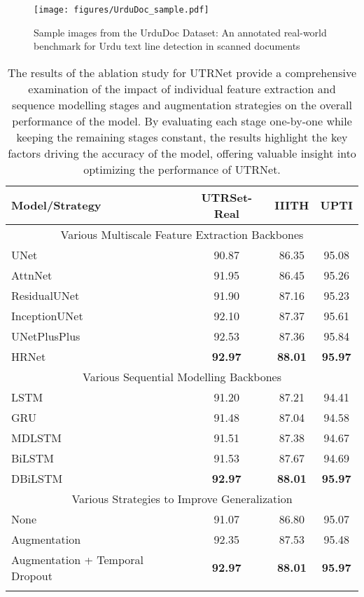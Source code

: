 \documentclass[runningheads]{llncs}
\newcommand{\ModelName}{{UTRNet}\xspace}
\newcommand{\DatasetNameReal}{{UTRSet-Real}\xspace}
\newcommand{\DetectionDataset}{{UrduDoc}\xspace}
\begin{document}
\begin{figure}[t]
	\label{fig:urdudoc_samples}
	\texttt{[image: figures/UrduDoc\_sample.pdf]}
	\caption{Sample images from the {\DetectionDataset} Dataset: An annotated real-world benchmark for Urdu text line detection in scanned documents}
\end{figure} 
\begin{table}[t]
\centering
\setlength{\tabcolsep}{10pt}
\begin{tabular}{lccc}
	\toprule[1.5pt]
	\textbf{Model/Strategy} & \textbf{\DatasetNameReal} & \textbf{IIITH} & \textbf{UPTI} \\ 
	\midrule[1.5pt]
	\multicolumn{4}{c}{Various Multiscale Feature Extraction Backbones} \\
	\midrule[0.5pt]
	UNet \cite{unet_orig_paper} & 90.87 & 86.35 & 95.08 \\
	AttnNet \cite{attn_unet} & 91.95 & 86.45 & 95.26 \\
	ResidualUNet \cite{res_unet} & 91.90 & 87.16 & 95.23 \\
	InceptionUNet \cite{inception_unet} & 92.10 & 87.37 & 95.61 \\
	UNetPlusPlus \cite{unet_plus_plus} & 92.53 & 87.36 & 95.84 \\
	HRNet \cite{hrnet_orig} & \textbf{92.97} & \textbf{88.01} & \textbf{95.97} \\ 
\midrule[0.5pt]
	\multicolumn{4}{c}{Various Sequential Modelling Backbones} \\
	\midrule[0.5pt]
	LSTM & 91.20 & 87.21 & 94.41 \\
	GRU & 91.48 & 87.04 & 94.58 \\
	MDLSTM & 91.51 & 87.38 & 94.67 \\
	BiLSTM & 91.53 & 87.67 & 94.69 \\
	DBiLSTM & \textbf{92.97} & \textbf{88.01} & \textbf{95.97} \\ 
\midrule[0.5pt]
	\multicolumn{4}{c}{Various Strategies to Improve Generalization} \\
	\midrule[0.5pt]
	None & 91.07 & 86.80 & 95.07 \\
	Augmentation & 92.35 & 87.53 & 95.48\\
	Augmentation + Temporal Dropout & \textbf{92.97} & \textbf{88.01} & \textbf{95.97} \\  
	\bottomrule[1.5pt] \\
\end{tabular}
\caption{The results of the ablation study for {\ModelName} provide a comprehensive examination of the impact of individual feature extraction and sequence modelling stages and augmentation strategies on the overall performance of the model. By evaluating each stage one-by-one while keeping the remaining stages constant, the results highlight the key factors driving the accuracy of the model, offering valuable insight into optimizing the performance of UTRNet.}
\label{tab:ablation}
\vspace{-2em}
\end{table}
\end{document}
